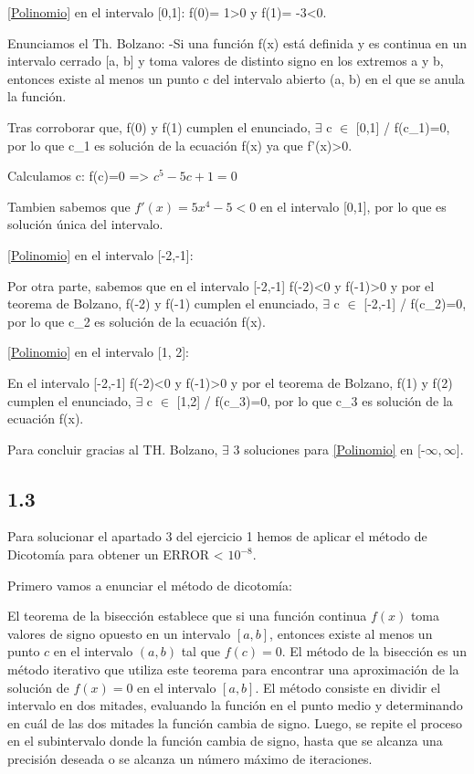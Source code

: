 \documentclass[12pt]{article}
\begin{document}
      \eqref{Polinomio} en el intervalo [0,1]:
      f(0)= 1>0 y f(1)= -3<0.

      Enunciamos el Th. Bolzano:
      -Si una función f(x) está definida y es continua en un intervalo cerrado [a, b] y toma valores de distinto signo en los extremos a y b, entonces existe al menos un punto c del intervalo abierto (a, b) en el que se anula la función. 

      Tras corroborar que, f(0) y f(1) cumplen el enunciado, $\exists$ c $\in$ [0,1] / f(c_{1})=0, por lo que c_{1} es solución de la ecuación f(x) ya que f'(x)>0.

      Calculamos c:
      f(c)=0 => $c^5-5c+1=0$

      Tambien sabemos que $f'(x)=5x^4-5 <0$ en el intervalo [0,1], por lo que es solución única del intervalo.

      \eqref{Polinomio} en el intervalo [-2,-1]:

      Por otra parte, sabemos que en el intervalo [-2,-1] f(-2)<0 y f(-1)>0 y por el teorema de Bolzano, f(-2) y f(-1) cumplen el enunciado, $\exists$ c $\in$ [-2,-1] / f(c_{2})=0, por lo que c_{2} es solución de la ecuación f(x).

      \eqref{Polinomio} en el intervalo [1, 2]:

      En el intervalo [-2,-1] f(-2)<0 y f(-1)>0 y por el teorema de Bolzano, f(1) y f(2) cumplen el enunciado, $\exists$ c $\in$ [1,2] / f(c_{3})=0, por lo que c_{3} es solución de la ecuación f(x).

      Para concluir gracias al TH. Bolzano, $\exists$ 3 soluciones para \eqref{Polinomio} en [-$\infty, \infty$].

    \subsection{1.3}

      Para solucionar el apartado 3 del ejercicio 1 hemos de aplicar el método de Dicotomía para obtener un ERROR < $10^{-8}$.

      Primero vamos a enunciar el método de dicotomía:

      El teorema de la bisección establece que si una función continua $f(x)$ toma valores de signo opuesto en un intervalo $[a,b]$, entonces existe al menos un punto $c$ en el intervalo $(a,b)$ tal que $f(c) = 0$. El método de la bisección es un método iterativo que utiliza este teorema para encontrar una aproximación de la solución de $f(x) = 0$ en el intervalo $[a,b]$. El método consiste en dividir el intervalo en dos mitades, evaluando la función en el punto medio y determinando en cuál de las dos mitades la función cambia de signo. Luego, se repite el proceso en el subintervalo donde la función cambia de signo, hasta que se alcanza una precisión deseada o se alcanza un número máximo de iteraciones.
\end{document}
